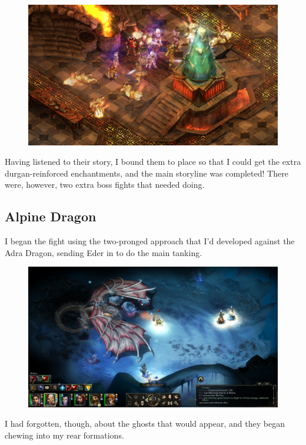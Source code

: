 \documentclass{article}
\begin{document}
\begin{figure}
\includegraphics[scale=0.33]{files/blog/2019_08_17_poe_potd_wmpt1/2019_08_17_durgans_battery_10.jpg}
\end{figure}

Having listened to their story, I bound them to place so that I could get the extra durgan-reinforced enchantments, and the main storyline was completed!  There were, however, two extra boss fights that needed doing.

\subsection{Alpine Dragon}

I began the fight using the two-pronged approach that I'd developed against the Adra Dragon, sending Eder in to do the main tanking.

\begin{figure}
\includegraphics[scale=0.33]{files/blog/2019_08_17_poe_potd_wmpt1/2019_08_17_alpine_dragon_1.jpg}
\end{figure}

I had forgotten, though, about the ghosts that would appear, and they began chewing into my rear formations.
\end{document}
